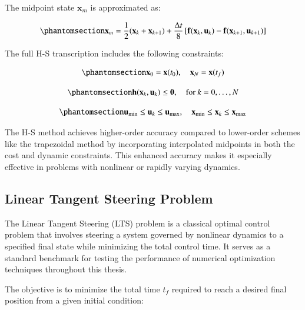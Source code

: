 \documentclass[
  number,
  preprint]{elsarticle}
\begin{document}
The midpoint state \(\mathbf{x}_m\) is approximated as:

\begin{equation}\protect\phantomsection\label{eq-ch2-hs-xm}{
\mathbf{x}_m = \frac{1}{2}(\mathbf{x}_k + \mathbf{x}_{k+1}) + \frac{\Delta t}{8} \left[ \mathbf{f}(\mathbf{x}_k, \mathbf{u}_k) - \mathbf{f}(\mathbf{x}_{k+1}, \mathbf{u}_{k+1}) \right]
}\end{equation}

The full H-S transcription includes the following constraints:

\begin{equation}\protect\phantomsection\label{eq-ch2-hs-bc}{
\mathbf{x}_0 = \mathbf{x}(t_0), \quad \mathbf{x}_N = \mathbf{x}(t_f)
}\end{equation}

\begin{equation}\protect\phantomsection\label{eq-ch2-hs-path}{
\mathbf{h}(\mathbf{x}_k, \mathbf{u}_k) \leq \mathbf{0}, \quad \text{for } k = 0, \dots, N
}\end{equation}

\begin{equation}\protect\phantomsection\label{eq-ch2-hs-bounds}{
\mathbf{u}_{\min} \leq \mathbf{u}_k \leq \mathbf{u}_{\max}, \quad \mathbf{x}_{\min} \leq \mathbf{x}_k \leq \mathbf{x}_{\max}
}\end{equation}

The H-S method achieves higher-order accuracy compared to lower-order
schemes like the trapezoidal method by incorporating interpolated
midpoints in both the cost and dynamic constraints. This enhanced
accuracy makes it especially effective in problems with nonlinear or
rapidly varying dynamics.

\subsection{Linear Tangent Steering Problem}\label{sec-ch2-lts}

The Linear Tangent Steering (LTS) problem \citep{bryson2018applied} is a
classical optimal control problem that involves steering a system
governed by nonlinear dynamics to a specified final state while
minimizing the total control time. It serves as a standard benchmark for
testing the performance of numerical optimization techniques throughout
this thesis.

The objective is to minimize the total time \(t_f\) required to reach a
desired final position from a given initial condition:
\end{document}
